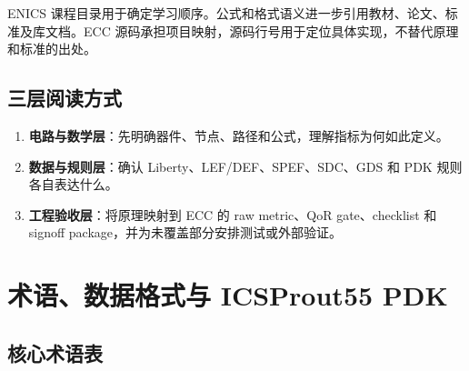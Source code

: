 \documentclass[UTF8,a4paper,11pt,fontset=fandol]{ctexart}
\numberwithin{equation}{section}
\begin{document}
ENICS 课程目录用于确定学习顺序\cite{enics}。公式和格式语义进一步引用教材、论文、标准及库文档\cite{weste,baker,liberty,lefdef,spef}。ECC 源码承担项目映射，源码行号用于定位具体实现，不替代原理和标准的出处\cite{ecc}。

\subsection{三层阅读方式}

\begin{enumerate}
  \item \textbf{电路与数学层}：先明确器件、节点、路径和公式，理解指标为何如此定义。
  \item \textbf{数据与规则层}：确认 Liberty、LEF/DEF、SPEF、SDC、GDS 和 PDK 规则各自表达什么。
  \item \textbf{工程验收层}：将原理映射到 ECC 的 raw metric、QoR gate、checklist 和 signoff package，并为未覆盖部分安排测试或外部验证。
\end{enumerate}

\section{术语、数据格式与 ICSProut55 PDK}

\subsection{核心术语表}
\end{document}
